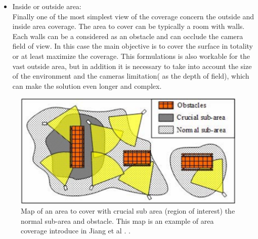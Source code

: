 \begin{itemize}
\item Inside or outside area:\\ 
Finally one of the most simplest  view of the coverage concern the outside and inside area coverage. The area to cover can be typically a room with walls. Each walls can be a considered as an obstacle and can occlude the camera field of view. In this case the main objective is to cover the surface in totality or at least maximize the coverage. This formulations is also workable for the vast outside area, but in addition it is necessary to take into account the size of the environment and the cameras limitation( as the depth of field), which can make the solution even longer and complex.
   
\end{itemize}
  


\begin{figure}[t!]
   \includegraphics[width=\linewidth]{img/MapRoI165.png}
  \caption{ Map of an area to cover with  crucial sub area (region of interest) the normal sub-area  and obstacle. This map is an example of area coverage  introduce in  Jiang et al \cite{165*jiang2010}. 
.}\label{fig:MapRoI165}
  \endminipage\hfill
\end{figure}

